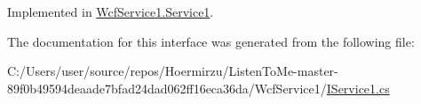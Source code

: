Implemented in \hyperlink{class_wcf_service1_1_1_service1_a4ba31cd1a202c84fac4d03461d8f4361}{Wcf\+Service1.\+Service1}.



The documentation for this interface was generated from the following file\+:\begin{DoxyCompactItemize}
\item 
C\+:/\+Users/user/source/repos/\+Hoermirzu/\+Listen\+To\+Me-\/master-\/89f0b49594deaade7bfad24dad062ff16eca36da/\+Wcf\+Service1/\hyperlink{_i_service1_8cs}{I\+Service1.\+cs}\end{DoxyCompactItemize}
